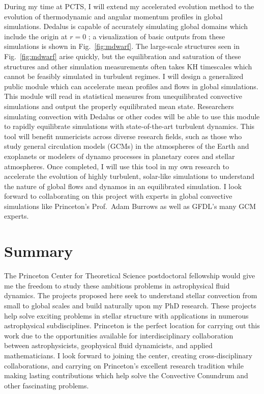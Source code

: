 \documentclass[11pt, preprint]{aastex}
\begin{document}
During my time at PCTS, I will extend my accelerated evolution method to the evolution of thermodynamic and angular momentum profiles in global simulations.
Dedalus is capable of accurately simulating global domains which include the origin at $r = 0$ \citep{lecoanet&all2019}; a visualization of basic outputs from these simulations is shown in Fig.~\ref{fig:mdwarf}.
The large-scale structures seen in Fig.~\ref{fig:mdwarf} arise quickly, but the equilibration and saturation of these structures and other simulation measurements often takes KH timescales which cannot be feasibly simulated in turbulent regimes.
I will design a generalized public module which can accelerate mean profiles and flows in global simulations.
This module will read in statistical measures from unequilibrated convective simulations and output the properly equilibrated mean state.
Researchers simulating convection with Dedalus or other codes will be able to use this module to rapidly equilibrate simulations with state-of-the-art turbulent dynamics.
This tool will benefit numericists across diverse research fields, such as those who study general circulation models (GCMs) in the atmospheres of the Earth and exoplanets or modelers of dynamo processes in planetary cores and stellar atmospheres.
Once completed, I will use this tool in my own research to accelerate the evolution of highly turbulent, solar-like simulations to understand the nature of global flows and dynamos in an equilibrated simulation.
I look forward to collaborating on this project with experts in global convective simulations like Princeton's Prof.~Adam Burrows as well as GFDL's many GCM experts.


\vspace{-24pt}
\section{Summary}
\vspace{-8pt}
The Princeton Center for Theoretical Science postdoctoral fellowship would give me the freedom to study these ambitious problems in astrophysical fluid dynamics.
The projects proposed here seek to understand stellar convection from small to global scales and build naturally upon my PhD research.
These projects help solve exciting problems in stellar structure with applications in numerous astrophysical subdisciplines.
Princeton is the perfect location for carrying out this work due to the opportunities available for interdisciplinary collaboration between astrophysicists, geophysical fluid dynamicists, and applied mathematicians.
I look forward to joining the center, creating cross-disciplinary collaborations, and carrying on Princeton's excellent research tradition while making lasting contributions which help solve the Convective Conundrum and other fascinating problems. 

\newpage


\end{document}
